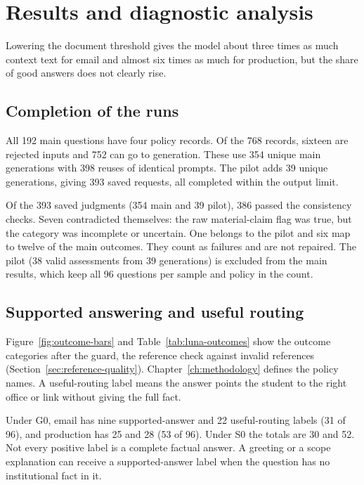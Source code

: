 \section{Results and diagnostic analysis}
\label{ch:results}

Lowering the document threshold gives the model about three times as much context text for email and almost six times as much for production, but the share of good answers does not clearly rise.

\subsection{Completion of the runs}

All 192 main questions have four policy records. Of the 768 records, sixteen are rejected inputs and 752 can go to generation. These use 354 unique main generations with 398 reuses of identical prompts. The pilot adds 39 unique generations, giving 393 saved requests, all completed within the output limit.

Of the 393 saved judgments (354 main and 39 pilot), 386 passed the consistency checks. Seven contradicted themselves: the raw material-claim flag was true, but the category was incomplete or uncertain. One belongs to the pilot and six map to twelve of the main outcomes. They count as failures and are not repaired. The pilot (38 valid assessments from 39 generations) is excluded from the main results, which keep all 96 questions per sample and policy in the count.

\subsection{Supported answering and useful routing}

Figure~\ref{fig:outcome-bars} and Table~\ref{tab:luna-outcomes} show the outcome categories after the guard, the reference check against invalid references (Section~\ref{sec:reference-quality}). Chapter~\ref{ch:methodology} defines the policy names. A useful-routing label means the answer points the student to the right office or link without giving the full fact.





Under G0, email has nine supported-answer and 22 useful-routing labels (31 of 96), and production has 25 and 28 (53 of 96). Under S0 the totals are 30 and 52. Not every positive label is a complete factual answer. A greeting or a scope explanation can receive a supported-answer label when the question has no institutional fact in it.

